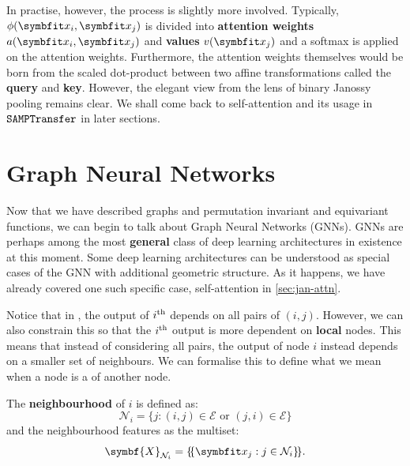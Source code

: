 In practise, however, the process is slightly more involved. Typically, $\phi(\bfitx_i, \bfitx_j)$ is divided into \textbf{attention weights} $a(\bfitx_i, \bfitx_j)$ and \textbf{values} $v(\bfitx_j)$ and a softmax is applied on the attention weights. Furthermore, the attention weights themselves would be born from the scaled dot-product between two affine transformations called the \textbf{query} and \textbf{key}.
However, the elegant view from the lens of binary Janossy pooling remains clear. We shall come back to self-attention and its usage in $\texttt{SAMPTransfer}$ in later sections.

\section{Graph Neural Networks}\label{sec:graph-nn}

Now that we have described graphs and permutation invariant and equivariant functions, we can begin to talk about Graph Neural Networks (GNNs). GNNs are perhaps among the most \textbf{general} class of deep learning architectures in existence at this moment. Some deep learning architectures can be understood as special cases of the GNN with additional geometric structure. As it happens, we have already covered one such specific case, self-attention in \cref{sec:jan-attn}.

Notice that in , the output of $i\textsuperscript{th}$ depends on all pairs of $(i, j)$. However, we can also constrain this so that the $i\textsuperscript{th}$ output is more dependent on \textbf{local} nodes. This means that instead of considering all pairs, the output of node $i$ instead depends on a smaller set of neighbours. We can formalise this to define what we mean when a node is a   of another node.

The \textbf{neighbourhood} of $i$ is defined as:
\begin{equation}
\mathcal{N}_{i}=\{j:(i, j) \in \mathcal{E} \text { or }(j, i) \in \mathcal{E}\}
\end{equation}
and the neighbourhood features as the multiset:
\begin{equation}
\symbf{X}_{\mathcal{N}_{i}}=\ldblbrace\bfitx_{j}: j \in \mathcal{N}_{i}\rdblbrace .
\end{equation}

